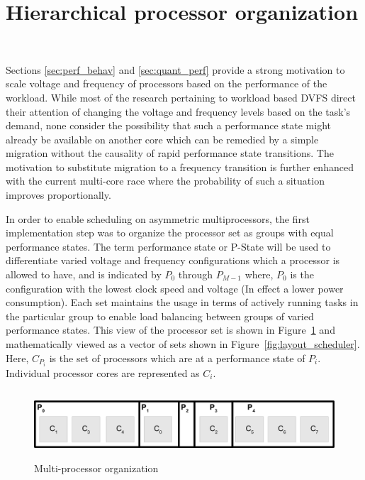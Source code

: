 \section{Hierarchical processor organization}~\label{sec:proc_org}

Sections \ref{sec:perf_behav} and \ref{sec:quant_perf}  provide a strong motivation to
scale voltage and frequency of processors based on the performance of the workload.
While most of the research pertaining to workload based DVFS direct their attention of changing the voltage and frequency levels
based on the task's demand, none consider the possibility that such a performance state might
already be available on another core which can be remedied by a simple migration without the 
causality of rapid performance state transitions. The motivation to substitute migration to
a frequency transition is further enhanced with the current multi-core race where the probability
of such a situation improves proportionally.  

In order to enable scheduling on asymmetric multiprocessors, the first implementation
step was to organize the processor set as groups with equal performance states. 
The term performance state or P-State will be used to differentiate varied voltage and
frequency configurations which a processor is allowed to have, and is indicated by
$P_{0}$ through $P_{M-1}$ where, $P_0$ is the configuration with the lowest clock speed
and voltage (In effect a lower power consumption). Each set maintains the usage in terms
of actively running tasks in the particular group to enable load balancing between 
groups of varied performance states. This view of the processor set is shown in
Figure~\ref{fig:processor_groups} and mathematically viewed as a vector of sets shown in Figure~\ref{fig:layout_scheduler}.
Here, $C_{P_{i}}$ is the set of processors which are at 
a performance state of $P_{i}$. Individual processor cores are represented as $C_{i}$.


\begin{figure}[h!]
  \begin{center}
    \includegraphics[height=1in]{figures/Processor_Organization.jpg}%
    \caption{Multi-processor organization}
    \label{fig:processor_groups}
  \end{center}
\end{figure}

